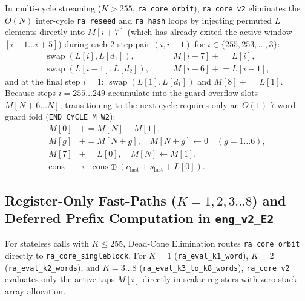 \documentclass[conference]{IEEEtran}
\DeclareMathOperator{\swap}{swap}
\begin{document}
In multi-cycle streaming ($K > 255$, \texttt{ra\_core\_orbit}), \texttt{ra\_core v2} eliminates the $O(N)$ inter-cycle \texttt{ra\_reseed} and \texttt{ra\_hash} loops by injecting permuted $L$ elements directly into $M[i+7]$ (which has already exited the active window $[i-1\ldots i+5]$) during each 2-step pair $(i, i-1)$ for $i \in \{255, 253, \dots, 3\}$:
\begin{equation}
\begin{aligned}
\swap(L[i], L[d_1]), &\qquad M[i+7] \mathrel{+}= L[i], \\
\swap(L[i-1], L[d_2]), &\qquad M[i+6] \mathrel{+}= L[i-1],
\end{aligned}
\end{equation}
and at the final step $i = 1$: $\swap(L[1], L[d_1])$ and $M[8] \mathrel{+}= L[1]$. Because steps $i = 255\ldots 249$ accumulate into the guard overflow slots $M[N+6\ldots N]$, transitioning to the next cycle requires only an $O(1)$ 7-word guard fold (\texttt{END\_CYCLE\_M\_W2}):
\begin{equation}\label{eq:guard_fold}
\begin{aligned}
M[0] &\mathrel{+}= M[N] - M[1], \\
M[g] &\mathrel{+}= M[N+g], \quad M[N+g] \leftarrow 0 \quad (g = 1\ldots 6), \\
M[7] &\mathrel{+}= L[0], \quad M[N] \leftarrow M[1], \\
\text{cons} &\leftarrow \text{cons} \oplus (c_{\text{last}} + s_{\text{last}} + L[0]).
\end{aligned}
\end{equation}

\subsection{Register-Only Fast-Paths ($K=1, 2, 3\ldots 8$) and Deferred Prefix Computation in \texttt{eng\_v2\_E2}}\label{sec:engine}

For stateless calls with $K \le 255$, Dead-Cone Elimination routes \texttt{ra\_core\_orbit} directly to \texttt{ra\_core\_singleblock}. For $K=1$ (\texttt{ra\_eval\_k1\_word}), $K=2$ (\texttt{ra\_eval\_k2\_words}), and $K=3\ldots 8$ (\texttt{ra\_eval\_k3\_to\_k8\_words}), \texttt{ra\_core v2} evaluates only the active taps $M[i]$ directly in scalar registers with zero stack array allocation.
\end{document}
